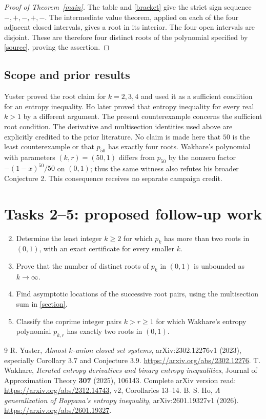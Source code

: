 \documentclass[11pt]{article}
\begin{document}
\begin{proof}[Proof of Theorem~\ref{main}]
The table and \eqref{bracket} give the strict sign sequence
$-,+,-,+,-$. The intermediate value theorem, applied on each of the
four adjacent closed intervals, gives a root in its interior. The four
open intervals are disjoint. These are therefore four distinct roots
of the polynomial specified by \eqref{source}, proving the assertion.
\end{proof}

\subsection*{Scope and prior results}
Yuster proved the root claim for $k=2,3,4$ and used it as a sufficient
condition for an entropy inequality. Ho \cite{H} later proved that
entropy inequality for every real $k>1$ by a different argument.
The present counterexample concerns the sufficient root condition.
The derivative and multisection identities used above are explicitly
credited to the prior literature. No claim is made here that $50$ is
the least counterexample or that $p_{50}$ has exactly four roots.
Wakhare's polynomial with parameters $(k,r)=(50,1)$ differs from
$p_{50}$ by the nonzero factor $-(1-x)^{50}/50$ on $(0,1)$; thus the
same witness also refutes his broader Conjecture 2. This consequence
receives no separate campaign credit.

\section*{Tasks 2--5: proposed follow-up work}
\begin{enumerate}
\setcounter{enumi}{1}
\item Determine the least integer $k\ge2$ for which $p_k$ has more than
two roots in $(0,1)$, with an exact certificate for every smaller $k$.
\item Prove that the number of distinct roots of $p_k$ in $(0,1)$ is
unbounded as $k\to\infty$.
\item Find asymptotic locations of the successive root pairs, using the
multisection sum in \eqref{section}.
\item Classify the coprime integer pairs $k>r\ge1$ for which Wakhare's
entropy polynomial $p_{k,r}$ has exactly two roots in $(0,1)$.
\end{enumerate}

\begin{thebibliography}{9}
 R. Yuster, \emph{Almost $k$-union closed set systems},
arXiv:2302.12276v1 (2023), especially Corollary 3.7 and Conjecture 3.9.
\url{https://arxiv.org/abs/2302.12276}.
 T. Wakhare, \emph{Iterated entropy derivatives and binary
entropy inequalities}, Journal of Approximation Theory \textbf{307}
(2025), 106143. Complete arXiv version read:
\url{https://arxiv.org/abs/2312.14743}, v2, Corollaries 13--14.
 B. S. Ho, \emph{A generalization of Boppana's entropy
inequality}, arXiv:2601.19327v1 (2026).
\url{https://arxiv.org/abs/2601.19327}.
\end{thebibliography}
\end{document}
